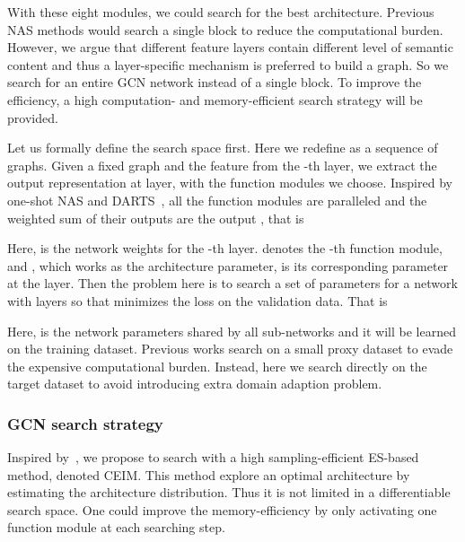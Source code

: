 \documentclass[letterpaper]{article} \usepackage{aaai19}  \usepackage{times}  \usepackage{helvet} \usepackage{courier}  \usepackage[hyphens]{url}  \usepackage{graphicx} \urlstyle{rm} \def\UrlFont{\rm}  \usepackage{graphicx}  \frenchspacing  \setlength{\pdfpagewidth}{8.5in}  \setlength{\pdfpageheight}{11in}
\begin{document}
With these eight modules, we could search for the best architecture. Previous NAS methods would search a single block to reduce the computational burden. However, we argue that different feature layers contain different level of semantic content and thus a layer-specific mechanism is preferred to build a graph. So we search for an entire GCN network instead of a single block. To improve the efficiency, a high computation- and memory-efficient search strategy will be provided. 

Let us formally define the search space first. Here we redefine  as a sequence of graphs. Given a fixed graph  and the feature  from the -th layer, we extract the output representation  at  layer, with the function modules we choose. Inspired by one-shot NAS and DARTS~\cite{liu2018darts}, all the function modules are paralleled and the weighted sum of their outputs are the output , that is

Here,  is the network weights for the -th layer.  denotes the -th function module, and , which works as the architecture parameter, is its corresponding parameter at the  layer. Then the problem here is to search a set of parameters  for a network with  layers so that  minimizes the loss  on the validation data. That is

Here,  is the network parameters shared by all sub-networks and it will be learned on the training dataset. Previous works search on a small proxy dataset to evade the expensive computational burden. Instead, here we search directly on the target dataset to avoid introducing extra domain adaption problem.






\subsubsection{GCN search strategy}
Inspired by~\cite{pourchot2018cem}, we propose to search with a high sampling-efficient ES-based method, denoted CEIM. This method explore an optimal architecture by estimating the architecture distribution. Thus it is not limited in a differentiable search space. One could improve the memory-efficiency by only activating one function module at each searching step.
\end{document}
